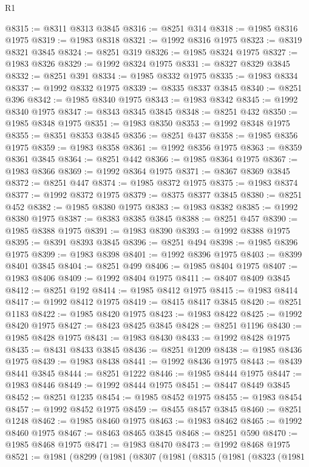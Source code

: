 \begin{lexlean}{R1}
\begin{coremodule}
@8315 := @8311 @8313 @3845
@8316 := @8251 @314
@8318 := @1985 @8316 @1975
@8319 := @1983 @8318
@8321 := @1992 @8316 @1975
@8323 := @8319 @8321 @3845
@8324 := @8251 @319
@8326 := @1985 @8324 @1975
@8327 := @1983 @8326
@8329 := @1992 @8324 @1975
@8331 := @8327 @8329 @3845
@8332 := @8251 @391
@8334 := @1985 @8332 @1975
@8335 := @1983 @8334
@8337 := @1992 @8332 @1975
@8339 := @8335 @8337 @3845
@8340 := @8251 @396
@8342 := @1985 @8340 @1975
@8343 := @1983 @8342
@8345 := @1992 @8340 @1975
@8347 := @8343 @8345 @3845
@8348 := @8251 @432
@8350 := @1985 @8348 @1975
@8351 := @1983 @8350
@8353 := @1992 @8348 @1975
@8355 := @8351 @8353 @3845
@8356 := @8251 @437
@8358 := @1985 @8356 @1975
@8359 := @1983 @8358
@8361 := @1992 @8356 @1975
@8363 := @8359 @8361 @3845
@8364 := @8251 @442
@8366 := @1985 @8364 @1975
@8367 := @1983 @8366
@8369 := @1992 @8364 @1975
@8371 := @8367 @8369 @3845
@8372 := @8251 @447
@8374 := @1985 @8372 @1975
@8375 := @1983 @8374
@8377 := @1992 @8372 @1975
@8379 := @8375 @8377 @3845
@8380 := @8251 @452
@8382 := @1985 @8380 @1975
@8383 := @1983 @8382
@8385 := @1992 @8380 @1975
@8387 := @8383 @8385 @3845
@8388 := @8251 @457
@8390 := @1985 @8388 @1975
@8391 := @1983 @8390
@8393 := @1992 @8388 @1975
@8395 := @8391 @8393 @3845
@8396 := @8251 @494
@8398 := @1985 @8396 @1975
@8399 := @1983 @8398
@8401 := @1992 @8396 @1975
@8403 := @8399 @8401 @3845
@8404 := @8251 @499
@8406 := @1985 @8404 @1975
@8407 := @1983 @8406
@8409 := @1992 @8404 @1975
@8411 := @8407 @8409 @3845
@8412 := @8251 @192
@8414 := @1985 @8412 @1975
@8415 := @1983 @8414
@8417 := @1992 @8412 @1975
@8419 := @8415 @8417 @3845
@8420 := @8251 @1183
@8422 := @1985 @8420 @1975
@8423 := @1983 @8422
@8425 := @1992 @8420 @1975
@8427 := @8423 @8425 @3845
@8428 := @8251 @1196
@8430 := @1985 @8428 @1975
@8431 := @1983 @8430
@8433 := @1992 @8428 @1975
@8435 := @8431 @8433 @3845
@8436 := @8251 @1209
@8438 := @1985 @8436 @1975
@8439 := @1983 @8438
@8441 := @1992 @8436 @1975
@8443 := @8439 @8441 @3845
@8444 := @8251 @1222
@8446 := @1985 @8444 @1975
@8447 := @1983 @8446
@8449 := @1992 @8444 @1975
@8451 := @8447 @8449 @3845
@8452 := @8251 @1235
@8454 := @1985 @8452 @1975
@8455 := @1983 @8454
@8457 := @1992 @8452 @1975
@8459 := @8455 @8457 @3845
@8460 := @8251 @1248
@8462 := @1985 @8460 @1975
@8463 := @1983 @8462
@8465 := @1992 @8460 @1975
@8467 := @8463 @8465 @3845
@8468 := @8251 @590
@8470 := @1985 @8468 @1975
@8471 := @1983 @8470
@8473 := @1992 @8468 @1975
@8521 := @1981
    (@8299
      (@1981
        (@8307
          (@1981
            (@8315
              (@1981
                (@8323
                  (@1981

\end{coremodule}
\end{lexlean}
